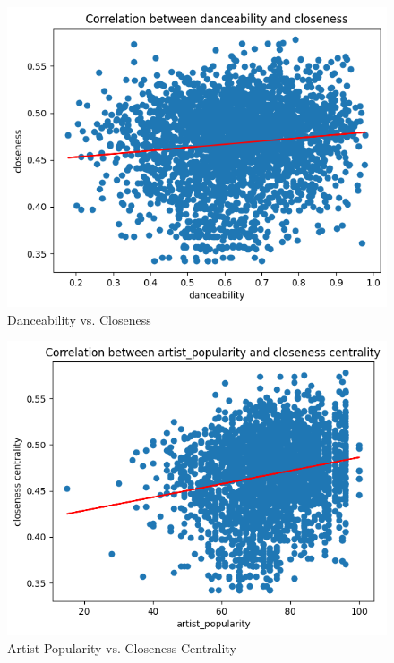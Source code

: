\documentclass[conference]{IEEEtran}
\begin{document}
\begin{figure}[h!]
    \centering
    \includegraphics[width=1\linewidth]{images/2.png}
    \caption{Danceability vs. Closeness}
    \label{fig:enter-label}
\end{figure}

\begin{figure}[h!]
    \centering
    \includegraphics[width=1\linewidth]{images/3.png}
    \caption{Artist Popularity vs. Closeness Centrality}
    \label{fig:enter-label}
\end{figure}
\end{document}
